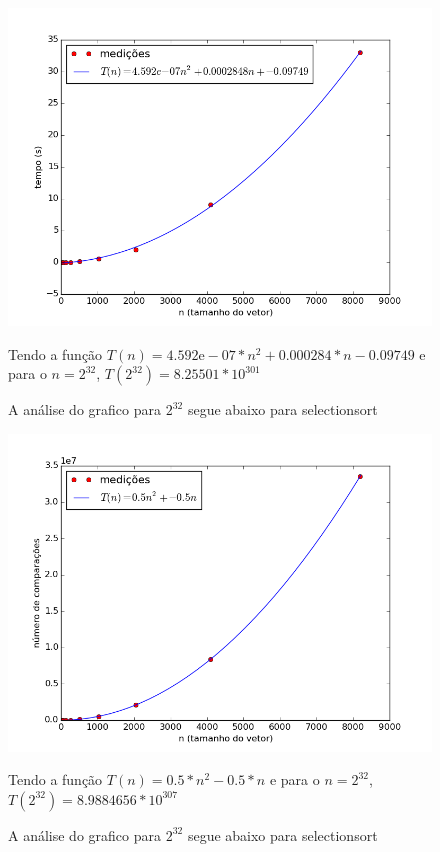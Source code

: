 \documentclass[12pt,a4paper,twoside]{report}
\begin{document}


\begin{figure}[ht]
\centering \includegraphics[scale=0.8]{../selectionsort/imagens/selectionsortQuaseCresc100.png}
\caption{A análise do grafico para $2^{32}$ segue abaixo para selectionsort}

Tendo a função $T(n) = 4.592\mathrm{e}-07*n^{2}+0.000284*n-0.09749$ e para o $n =2^{32}$, $T(2^{32}) = 8.25501*10^{301}$
\label{fig:selectionsortQuaseCresc100}
\end{figure}

\begin{figure}[ht]
\centering \includegraphics[scale=0.8]{../selectionsort/imagens/selectionsortQuaseCresc101.png}
\caption{A análise do grafico para $2^{32}$ segue abaixo para selectionsort}

Tendo a função $T(n) = 0.5*n^{2}-0.5*n$ e para o $n =2^{32}$, $T(2^{32}) =8.9884656 * 10^{307}$
\label{fig:selectionsortQuaseCresc101}
\end{figure}
\end{document}

